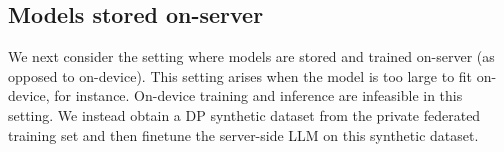 \subsection{Models stored on-server}


We next consider the setting where models are stored and trained on-server (as opposed to on-device). This setting arises when the model is too large to fit on-device, for instance. 
On-device training  and inference are infeasible in this setting. We instead obtain a DP synthetic dataset from the private federated training set and then finetune the server-side LLM on this synthetic dataset.

